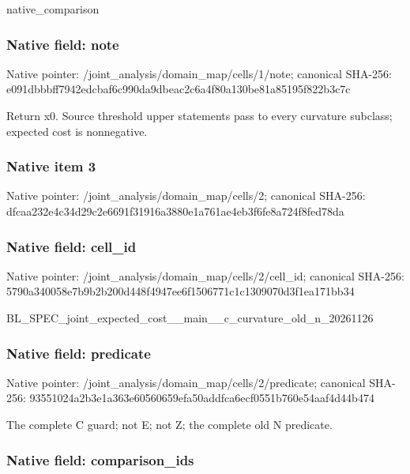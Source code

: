 \documentclass[10pt,a4paper]{article}
\begin{document}
native\_comparison


\subsubsection{Native field: note}


Native pointer: /joint\_analysis/domain\_map/cells/1/note; canonical SHA-256: e091dbbbff7942edcbaf6c99\allowbreak{}0da9dbeac2c6a4f80a130be8\allowbreak{}1a85195f822b3c7c


Return x0. Source threshold upper statements pass to every curvature subclass; expected cost is nonnegative.


\subsubsection{Native item 3}


Native pointer: /joint\_analysis/domain\_map/cells/2; canonical SHA-256: dfcaa232e4c34d29c2e6691f\allowbreak{}31916a3880e1a761ae4eb3f6\allowbreak{}fe8a724f8fed78da



\subsubsection{Native field: cell\_id}


Native pointer: /joint\_analysis/domain\_m\allowbreak{}ap/cells/2/cell\_id; canonical SHA-256: 5790a340058e7b9b2b200d44\allowbreak{}8f4947ee6f1506771c1c1309\allowbreak{}070d3f1ea171bb34


BL\_SPEC\_joint\_expected\_c\allowbreak{}ost\_\_main\_\_c\_curvature\_o\allowbreak{}ld\_n\_20261126


\subsubsection{Native field: predicate}


Native pointer: /joint\_analysis/domain\_m\allowbreak{}ap/cells/2/predicate; canonical SHA-256: 93551024a2b3e1a363e60560\allowbreak{}659efa50addfca6ecf0551b7\allowbreak{}60e54aaf4d44b474


The complete C guard; not E; not Z; the complete old N predicate.


\subsubsection{Native field: comparison\_ids}
\end{document}
